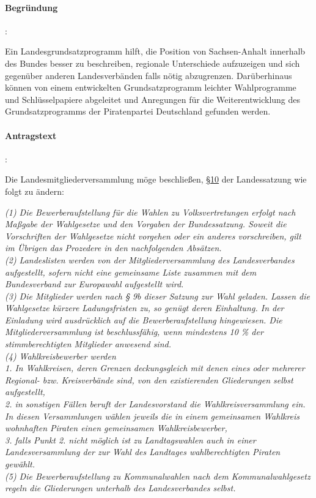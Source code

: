 \paragraph{Begründung}:

Ein Landesgrundsatzprogramm hilft, die Position von Sachsen-Anhalt innerhalb des Bundes besser zu beschreiben, regionale Unterschiede aufzuzeigen und sich gegenüber anderen Landesverbänden falls nötig abzugrenzen. Darüberhinaus können von einem entwickelten Grundsatzprogramm leichter Wahlprogramme und Schlüsselpapiere abgeleitet und Anregungen für die Weiterentwicklung des Grundsatzprogramms der Piratenpartei Deutschland gefunden werden.



\paragraph{Antragstext}:

Die Landesmitgliederversammlung möge beschließen, \href{http://wiki.piratenpartei.de/LSA:Satzung#.C2.A7_10_-_Bewerberaufstellung_f.C3.BCr_die_Wahlen_zu_Volksvertretungen}{§10} der Landessatzung wie folgt zu ändern: 

\textit{(1) Die Bewerberaufstellung für die Wahlen zu Volksvertretungen erfolgt nach Maßgabe der Wahlgesetze und den Vorgaben der Bundessatzung. Soweit die Vorschriften der Wahlgesetze nicht vorgehen oder ein anderes vorschreiben, gilt im Übrigen das Prozedere in den nachfolgenden Absätzen.\\
(2) Landeslisten werden von der Mitgliederversammlung des Landesverbandes aufgestellt, sofern nicht eine gemeinsame Liste zusammen mit dem Bundesverband zur Europawahl aufgestellt wird.\\
(3) Die Mitglieder werden nach § 9b dieser Satzung zur Wahl geladen. Lassen die Wahlgesetze kürzere Ladungsfristen zu, so genügt deren Einhaltung. In der Einladung wird ausdrücklich auf die Bewerberaufstellung hingewiesen. Die Mitgliederversammlung ist beschlussfähig, wenn mindestens 10 \% der stimmberechtigten Mitglieder anwesend sind.\\
(4) Wahlkreisbewerber werden\\
1. In Wahlkreisen, deren Grenzen deckungsgleich mit denen eines oder mehrerer Regional- bzw. Kreisverbände sind, von den existierenden Gliederungen selbst aufgestellt,\\
2. in sonstigen Fällen beruft der Landesvorstand die Wahlkreisversammlung ein. In diesen Versammlungen wählen jeweils die in einem gemeinsamen Wahlkreis wohnhaften Piraten einen gemeinsamen Wahlkreisbewerber,\\
3. falls Punkt 2. nicht möglich ist zu Landtagswahlen auch in einer Landesversammlung der zur Wahl des Landtages wahlberechtigten Piraten gewählt.\\
(5) Die Bewerberaufstellung zu Kommunalwahlen nach dem Kommunalwahlgesetz regeln die Gliederungen unterhalb des Landesverbandes selbst.}

